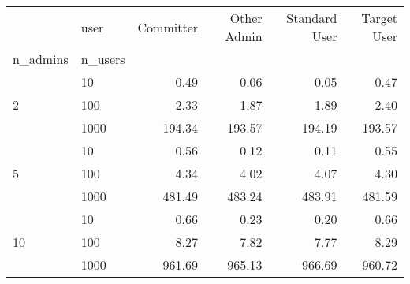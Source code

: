 \begin{tabular}{llrrrr}
\toprule
 & user & Committer & Other Admin & Standard User & Target User \\
n_admins & n_users &  &  &  &  \\
\midrule
\multirow[t]{3}{*}{2} & 10 & 0.49 & 0.06 & 0.05 & 0.47 \\
 & 100 & 2.33 & 1.87 & 1.89 & 2.40 \\
 & 1000 & 194.34 & 193.57 & 194.19 & 193.57 \\
\cline{1-6}
\multirow[t]{3}{*}{5} & 10 & 0.56 & 0.12 & 0.11 & 0.55 \\
 & 100 & 4.34 & 4.02 & 4.07 & 4.30 \\
 & 1000 & 481.49 & 483.24 & 483.91 & 481.59 \\
\cline{1-6}
\multirow[t]{3}{*}{10} & 10 & 0.66 & 0.23 & 0.20 & 0.66 \\
 & 100 & 8.27 & 7.82 & 7.77 & 8.29 \\
 & 1000 & 961.69 & 965.13 & 966.69 & 960.72 \\
\cline{1-6}
\bottomrule
\end{tabular}
